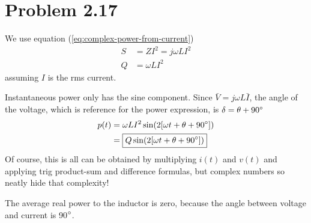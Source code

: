 \documentclass{homework}
\begin{document}
\section{Problem 2.17}
\begin{letterenum}
    \item We use equation (\ref{eq:complex-power-from-current})
    \begin{align*}
        S &= ZI^2 = j\omega L I^2 \\
        Q &= \boxed{\omega L I^2}
    \end{align*}
    assuming $I$ is the rms current.

    \item Instantaneous power only has the sine component. Since
    $\bar{V} = j \omega L \bar{I}$, the angle of the voltage,
    which is reference for the power expression, is
    $\delta = \theta + 90 \degree$
    \begin{align*}
        p(t) &= \omega L I^2 \sin (2[\omega t + \theta + 90\degree]) \\
             &= \boxed{Q \sin (2[\omega t + \theta + 90\degree])}
    \end{align*}
    Of course, this is all can be obtained by multiplying
    $i(t)$ and $v(t)$ and applying trig product-sum and difference
    formulas, but complex numbers so neatly hide that complexity!

    \item The average real power to the inductor is zero, 
    because the angle between voltage and current is 90$\degree$.
\end{letterenum}
\end{document}
